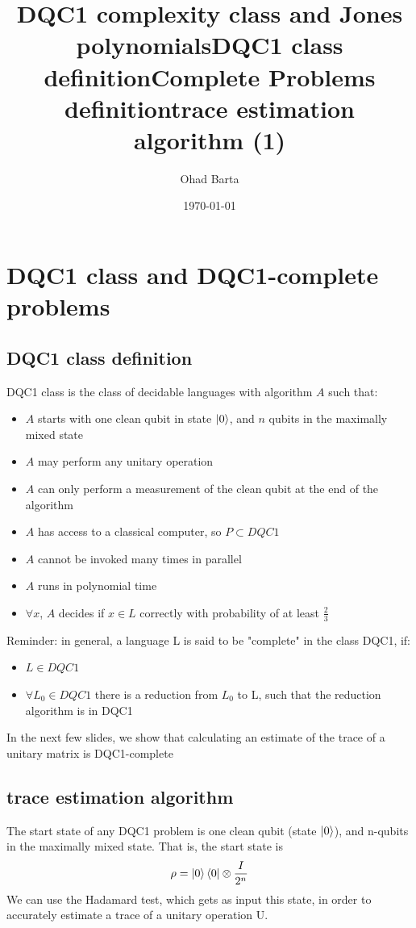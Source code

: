\documentclass{article}
\begin{document}
\title{DQC1 complexity class and Jones polynomials} 
\author{Ohad Barta}
\date{\today} 

\titlepage
\tableofcontents



\section{DQC1 class and DQC1-complete problems}
\subsection{DQC1 class definition  } 
\title{DQC1 class definition} 
DQC1 class is the class of decidable languages with algorithm $A$ such that:
\begin{itemize}
\item $A$ starts with one clean qubit in state $\left\vert{0}\right\rangle$, and $n$ qubits in the maximally mixed state
\item $A$ may perform any unitary operation
\item $A$ can only perform a measurement of the clean qubit at the end of the algorithm
\item $A$ has access to a classical computer, so $P \subset DQC1$ 
\item $A$ cannot be invoked many times in parallel
\item $A$ runs in polynomial time
\item $\forall x$, $A$ decides if $x \in L$ correctly with probability of at least $\frac{2}{3}$
\end{itemize}


\title{Complete Problems definition} 
Reminder: in general, a language L is said to be "complete" in the class DQC1, if:
\begin{itemize}
\item $L \in DQC1$
\item $\forall L_{0} \in DQC1$ there is a reduction from $L_{0}$ to L, such that the reduction algorithm is in DQC1  
\end{itemize}
In the next few slides, we show that calculating an estimate of the trace of a unitary matrix is DQC1-complete


\subsection{trace estimation algorithm  }
\title{trace estimation algorithm (1)}
The start state of any DQC1 problem is one clean qubit (state $\left\vert{0}\right\rangle$), and n-qubits in the maximally mixed state.
That is, the start state is
\begin{equation}
\rho = \left\vert{0}\right\rangle\left\langle{0}\right\vert\otimes\frac{I}{2^n}
\end{equation}
We can use the Hadamard test, which gets as input this state, in order to accurately estimate a trace
of a unitary operation U.
\end{document}
